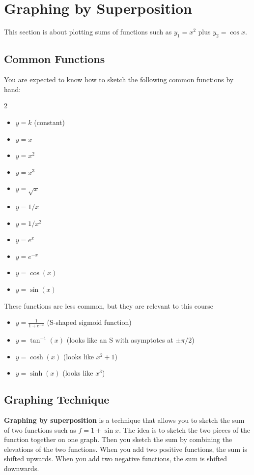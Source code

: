 \documentclass[10pt,letterpaper]{article}
\begin{document}

\section{Graphing by Superposition}
This section is about plotting sums of functions such as $y_1=x^2$ plus $y_2=\cos x$.

\subsection{Common Functions}
You are expected to know how to sketch the following common functions by hand:
\begin{multicols}{2}
\begin{itemize}
    \item $y=k$ (constant)
    \item $y=x$
    \item $y=x^2$
    \item $y=x^3$
    \item $y=\sqrt{x}$
    \item $y=1/x$
    \item $y=1/x^2$
    \item $y=e^x$
    \item $y=e^{-x}$
    \item $y=\cos(x)$
    \item $y=\sin(x)$
\end{itemize}
\end{multicols}

\noindent These functions are less common, but they are relevant to this course
\begin{itemize}
    \item $y=\frac{1}{1+e^{-x}}$ \quad  (S-shaped sigmoid function)
    \item $y=\tan^{-1}(x)$ \quad (looks like an S with asymptotes at $\pm\pi/2$)
    \item $y=\cosh (x)$ \quad (looks like $x^2+1$)
    \item $y=\sinh(x)$ \quad (looks like $x^3$)
\end{itemize}

\subsection{Graphing Technique}
\textbf{Graphing by superposition} is a technique that allows you to sketch the sum of two functions such as $f = 1 + \sin x$. The idea is to sketch the two pieces of the function together on one graph. Then you sketch the sum by combining the elevations of the two functions. When you add two positive functions, the sum is shifted upwards. When you add two negative functions, the sum is shifted downwards. 
\end{document}
